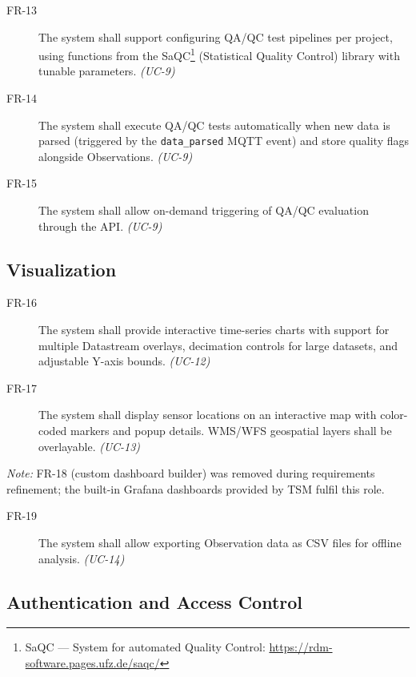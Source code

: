 \begin{description}
  \item[FR-13] The system shall support configuring QA/QC test pipelines per project, using
    functions from the SaQC\footnote{SaQC --- System for automated Quality Control: \url{https://rdm-software.pages.ufz.de/saqc/}} (Statistical Quality Control) library with tunable parameters.
    \emph{(UC-9)}
  \item[FR-14] The system shall execute QA/QC tests automatically when new data is parsed
    (triggered by the \texttt{data\_parsed} MQTT event) and store quality flags alongside
    Observations. \emph{(UC-9)}
  \item[FR-15] The system shall allow on-demand triggering of QA/QC evaluation through the
    API. \emph{(UC-9)}
\end{description}

\subsection{Visualization}
\label{sec:req-functional-viz}

\begin{description}
  \item[FR-16] The system shall provide interactive time-series charts with support for multiple
    Datastream overlays, decimation controls for large datasets, and adjustable Y-axis bounds.
    \emph{(UC-12)}
  \item[FR-17] The system shall display sensor locations on an interactive map with color-coded
    markers and popup details. WMS/WFS geospatial layers shall be overlayable. \emph{(UC-13)}
\end{description}

\noindent\textit{Note:} FR-18 (custom dashboard builder) was removed during requirements
refinement; the built-in Grafana dashboards provided by TSM fulfil this role.

\begin{description}
  \item[FR-19] The system shall allow exporting Observation data as CSV files for offline
    analysis. \emph{(UC-14)}
\end{description}

\subsection{Authentication and Access Control}
\label{sec:req-functional-auth}

